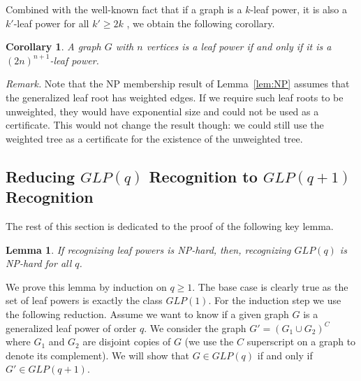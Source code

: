\documentclass[11pt, letter]{article}
\newcommand{\ml}[1]{{\color{blue}{{#1}}}}
\newtheorem{lemma}[theorem]{Lemma}
\newtheorem{cor}[theorem]{Corollary}
\theoremstyle{remark}
\begin{document}
\lrank*

Combined with the well-known fact that if a graph is a $k$-leaf power, it is also a $k'$-leaf power for all $k' \geq 2k$ \cite{WB09}, we obtain the following corollary.

\begin{cor}
    A graph $G$ with $n$ vertices is a leaf power if and only if it is a $(2n)^{n+1}$-leaf power.
\end{cor}



\medskip 

\noindent 
\emph{Remark.}  Note that the NP membership result of Lemma~\ref{lem:NP} assumes that the generalized leaf root has weighted edges.  If we require such leaf roots to be unweighted, they would have exponential size and could not be used as a certificate.  This would not change the result though: we could still use the weighted tree as a certificate for the existence of the unweighted tree.


\subsection[Reducing GLP(q) Recognition to GLP(q+1) Recognition]{Reducing $GLP(q)$ Recognition to $GLP(q+1)$ Recognition}

The rest of this section is dedicated to the proof of the following key lemma.

\begin{lemma}\label{lemma:hierarchy}
    If recognizing leaf powers is NP-hard, then, recognizing $GLP(q)$ is NP-hard for all $q$.
\end{lemma}

We prove this lemma by induction on $q\geq 1$. The base case is clearly true as the set of leaf powers is exactly the class $GLP(1)$. For the induction step we use the following reduction. Assume we want to know if a given graph $G$ is a generalized leaf power of order $q$. We consider the graph $G'=(G_1\cup G_2)^C$ where $G_1$ and $G_2$ are disjoint copies of $G$ (we use the $C$ superscript on a graph to denote its complement). We will show that $G\in GLP(q)$ if and only if $G'\in GLP(q+1)$. 
\end{document}
